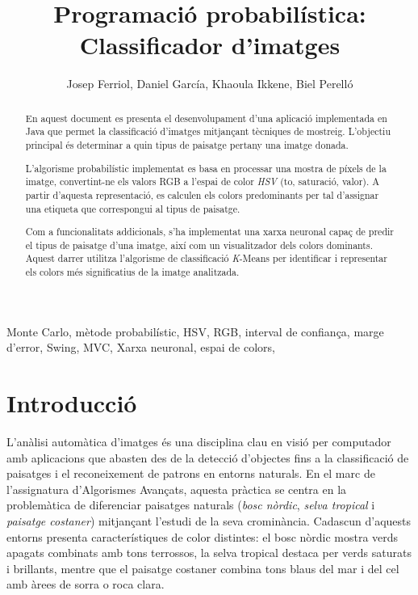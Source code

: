 \documentclass{ieeetj}
\begin{document}

\title{Programació probabilística: Classificador d’imatges}

\author{Josep Ferriol, Daniel García, Khaoula Ikkene, Biel Perelló}  



\begin{abstract}

En aquest document es presenta el desenvolupament d'una aplicació implementada en Java que permet la classificació d'imatges mitjançant tècniques de mostreig. L'objectiu principal és determinar a quin tipus de paisatge pertany una imatge donada.

L'algorisme probabilístic implementat es basa en processar una mostra de píxels de la imatge, convertint-ne els valors RGB a l'espai de color \emph{HSV} (to, saturació, valor). A partir d'aquesta representació, es calculen els colors predominants per tal d'assignar una etiqueta que correspongui al tipus de paisatge.

Com a funcionalitats addicionals, s'ha implementat una xarxa neuronal capaç de predir el tipus de paisatge d'una imatge, així com un visualitzador dels colors dominants. Aquest darrer utilitza l'algorisme de classificació \emph{K}-Means\cite{KMeans} per identificar i representar els colors més significatius de la imatge analitzada.

\end{abstract}

\begin{IEEEkeywords}
Monte Carlo, mètode probabilístic, HSV, RGB, interval de confiança, marge d'error, Swing, MVC, Xarxa neuronal, espai de colors, 
\end{IEEEkeywords}


\maketitle
\section{Introducció}
L’anàlisi automàtica d’imatges és una disciplina clau en visió per computador amb aplicacions que abasten des de la detecció d’objectes fins a la classificació de paisatges i el reconeixement de patrons en entorns naturals. \newline
En el marc de l’assignatura d’Algorismes Avançats, aquesta pràctica se centra en la problemàtica de diferenciar paisatges naturals (\emph{bosc nòrdic}, \emph{selva tropical} i \emph{paisatge costaner}) mitjançant l’estudi de la seva crominància. Cadascun d’aquests entorns presenta característiques de color distintes: el bosc nòrdic mostra verds apagats combinats amb tons terrossos, la selva tropical destaca per verds saturats i brillants, mentre que el paisatge costaner combina tons blaus del mar i del cel amb àrees de sorra o roca clara.\newline
\end{document}
